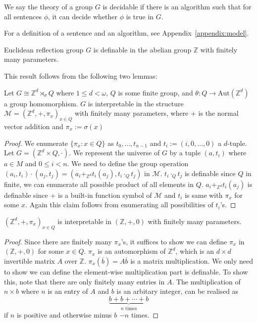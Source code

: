 \documentclass[../main.tex]{subfiles}
\begin{document}
\begin{definition}
    We say the theory of a group $G$ is decidable if there is an algorithm such that for all sentences $\phi$, it can decide whether $\phi$ is true in $G$.
\end{definition}

For a definition of a sentence and an algorithm, see Appendix~\ref{appendix:model}.

\begin{proposition}\label{thm:interp}
    Euclidean reflection group $G$ is definable in the abelian group $\mathbb Z$ with finitely many parameters.
\end{proposition}

This result follows from the following two lemmas:

\begin{lemma}
    Let $G \cong \mathbb Z^d \rtimes_{\sigma} Q$ where $1\leq d < \omega$, $Q$ is some finite group, and $\theta : Q \rightarrow \text{Aut}(\mathbb Z^d)$ a group homomorphism. $G$ is interpretable in the structure $\mathcal M = (\mathbb Z^d, +, \pi_x)_{x \in Q}$ with finitely many parameters, where $+$ is the normal vector addition and $\pi_x := \sigma(x)$
\end{lemma}

\begin{proof}
    We enumerate $\{\pi_x : x\in Q\}$ as $t_0,\dots,t_{n-1}$ and $t_i := (i,0,\dots,0)$ a $d$-tuple. Let $G=(\mathbb Z^d \times Q,\cdot)$. We represent the universe of $G$ by a tuple $(a,t_i)$ where $a\in M$ and $0\leq i < n$. We need to define the group operation $(a_i,t_i)\cdot(a_j,t_j)=(a_i +_{\mathbb Z^d} t_i(a_j), t_i \cdot_Q t_j)$ in $\mathcal M$. $t_i \cdot_Q t_j$ is definable since $Q$ in finite, we can enumerate all possible product of all elements in $Q$. $a_i +_{\mathbb Z^d} t_i(a_j)$ is definable since $+$ is a built-in function symbol of $\mathcal M$ and $t_i$ is same with $\pi_x$ for some $x$. Again this claim follows from enumerating all possibilities of $t_i$'s.
\end{proof}

\begin{lemma}
    $(\mathbb Z^d, +, \pi_x)_{x \in Q}$ is interpretable in $(\mathbb Z, +, 0)$ with finitely many parameters.
\end{lemma}

\begin{proof}
    Since there are finitely many $\pi_x$'s, it suffices to show we can define $\pi_x$ in $(\mathbb Z, +, 0)$ for some $x\in Q$. $\pi_x$ is an automorphism of $\mathbb Z^d$, which is an $d\times d$ invertible matrix $A$ over $\mathbb Z$.
    $\pi_x(\overline b)=A\overline b$ is a matrix multiplication. We only need to show we can define the element-wise multiplication part is definable. To show this, note that there are only finitely many entries in $A$. The multiplication of $n\times b$ where $n$ is an entry of $A$ and $b$ is an arbitary integer, can be realised as \[
    \underbrace{b+b+\cdots+b}_\text{$n$ times}
    \]
    if $n$ is positive and otherwise minus $b$ $-n$ times.
\end{proof}
\end{document}
